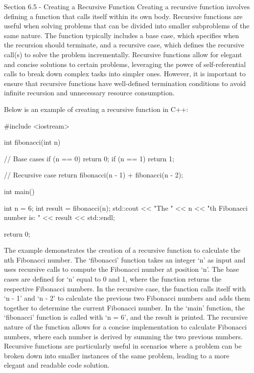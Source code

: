 \begin{notes}{Section 6.5 - Creating a Recursive Function}
    Creating a recursive function involves defining a function that calls itself within its own body. Recursive functions are useful when solving problems that can be divided into smaller subproblems of the same nature. The function typically includes a base case, which specifies when the recursion should terminate, and a recursive 
    case, which defines the recursive call(s) to solve the problem incrementally. Recursive functions allow for elegant and concise solutions to certain problems, leveraging the power of self-referential calls to break down complex tasks into simpler ones. However, it is important to ensure that recursive functions have well-defined 
    termination conditions to avoid infinite recursion and unnecessary resource consumption.
    
    \begin{highlight}
        Below is an example of creating a recursive function in C++:
    
    \begin{code}[C++]
    #include <iostream>

    int fibonacci(int n) {
        // Base cases
        if (n == 0)
            return 0;
        if (n == 1)
            return 1;
    
        // Recursive case
        return fibonacci(n - 1) + fibonacci(n - 2);
    }
    
    int main() {
        int n = 6;
        int result = fibonacci(n);
        std::cout << "The " << n << "th Fibonacci number is: " 
        << result << std::endl;
    
        return 0;
    }
    \end{code}
        The example demonstrates the creation of a recursive function to calculate the nth Fibonacci number. The `fibonacci' function takes an integer `n' as input and uses recursive calls to compute the Fibonacci number at position `n'. The base cases are defined for `n' equal to 0 and 1, where the function returns the respective Fibonacci 
        numbers. In the recursive case, the function calls itself with `n - 1' and `n - 2' to calculate the previous two Fibonacci numbers and adds them together to determine the current Fibonacci number. In the `main' function, the `fibonacci' function is called with `n = 6', and the result is printed. The recursive nature of the function 
        allows for a concise implementation to calculate Fibonacci numbers, where each number is derived by summing the two previous numbers. Recursive functions are particularly useful in scenarios where a problem can be broken down into smaller instances of the same problem, leading to a more elegant and readable code solution.
    \end{highlight}
\end{notes}

